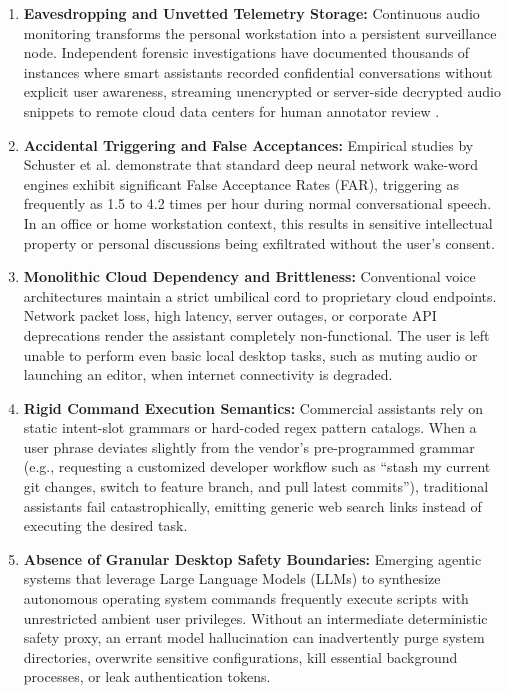 \begin{enumerate}
    \item \textbf{Eavesdropping and Unvetted Telemetry Storage:} Continuous audio monitoring transforms the personal workstation into a persistent surveillance node. Independent forensic investigations have documented thousands of instances where smart assistants recorded confidential conversations without explicit user awareness, streaming unencrypted or server-side decrypted audio snippets to remote cloud data centers for human annotator review \cite{malkin2022privacy, rawassizadeh2015smart}.
    \item \textbf{Accidental Triggering and False Acceptances:} Empirical studies by Schuster et al. \cite{schuster2018speech} demonstrate that standard deep neural network wake-word engines exhibit significant False Acceptance Rates (FAR), triggering as frequently as 1.5 to 4.2 times per hour during normal conversational speech. In an office or home workstation context, this results in sensitive intellectual property or personal discussions being exfiltrated without the user's consent.
    \item \textbf{Monolithic Cloud Dependency and Brittleness:} Conventional voice architectures maintain a strict umbilical cord to proprietary cloud endpoints. Network packet loss, high latency, server outages, or corporate API deprecations render the assistant completely non-functional. The user is left unable to perform even basic local desktop tasks, such as muting audio or launching an editor, when internet connectivity is degraded.
    \item \textbf{Rigid Command Execution Semantics:} Commercial assistants rely on static intent-slot grammars or hard-coded regex pattern catalogs. When a user phrase deviates slightly from the vendor's pre-programmed grammar (e.g., requesting a customized developer workflow such as ``stash my current git changes, switch to feature branch, and pull latest commits''), traditional assistants fail catastrophically, emitting generic web search links instead of executing the desired task.
    \item \textbf{Absence of Granular Desktop Safety Boundaries:} Emerging agentic systems that leverage Large Language Models (LLMs) to synthesize autonomous operating system commands frequently execute scripts with unrestricted ambient user privileges. Without an intermediate deterministic safety proxy, an errant model hallucination can inadvertently purge system directories, overwrite sensitive configurations, kill essential background processes, or leak authentication tokens.
\end{enumerate}

